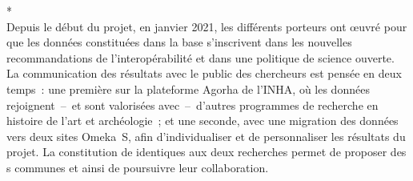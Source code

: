 * \\

Depuis le début du projet, en janvier 2021, les différents porteurs ont œuvré pour que les données constituées dans la base s’inscrivent dans les nouvelles recommandations de l’interopérabilité et dans une politique de science ouverte. La communication des résultats avec le public des chercheurs est pensée en deux temps~: une première sur la plateforme Agorha de l’INHA, où les données rejoignent~–~et sont valorisées avec~–~d’autres programmes de recherche en histoire de l’art et archéologie~; et une seconde, avec une migration des données vers deux sites Omeka~S, afin d’individualiser et de personnaliser les résultats du projet. La constitution de  identiques aux deux recherches permet de proposer des s communes et ainsi de poursuivre leur collaboration.